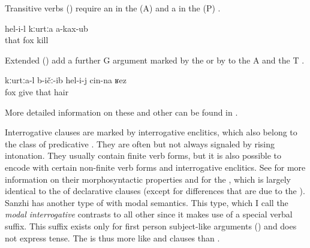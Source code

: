 Transitive verbs () require an  in the  (A) and a  in the  (P) . 
%
\begin{exe}
	\ex	\label{ex:He did not kill the fox}
	\gll	hel-i-l	kːurtːa a-kax-ub\\
		that	fox kill\\
	\glt	{}
\end{exe}

Extended  () add a further G argument marked by the  or by  to the  A and the  T .
%
\begin{exe}
	\ex	\label{ex:The fox gave him his hair}
	\gll	kːurtːa-l	b-ičː-ib	hel-i-j	cin-na	ʁez\\
		fox	give	that		hair\\
	\glt	{}
\end{exe}

More detailed information on these and other  can be found in .

Interrogative clauses are marked by interrogative enclitics, which also belong to the class of predicative . They are often but not always signaled by rising intonation. They usually contain finite verb forms, but it is also possible to encode  with certain non-finite verb forms and interrogative enclitics. See  for more information on their morphosyntactic properties and  for the , which is largely identical to the  of declarative clauses (except for differences that are due to the ). Sanzhi has another type of  with modal semantics. This type, which I call the \textit{modal interrogative} contrasts to all other  since it makes use of a special verbal suffix. This suffix exists only for first person subject-like arguments () and does not express tense. The  is thus more like  and  clauses than . 

